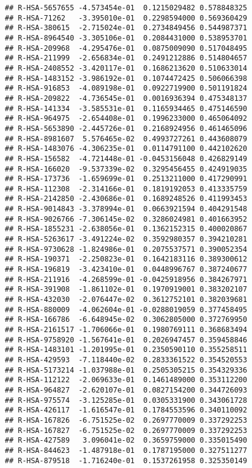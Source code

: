 \documentclass[
]{article}
\begin{document}
\begin{verbatim}
## R-HSA-5657655 -4.573454e-01  0.1215029482 0.578848325
## R-HSA-71262   -3.395010e-01  0.2298594000 0.569360429
## R-HSA-380615  -2.715024e-01  0.2734849456 0.544987371
## R-HSA-8964540 -3.305106e-01  0.2084431000 0.538953701
## R-HSA-209968  -4.295476e-01  0.0875009090 0.517048495
## R-HSA-211999  -2.656834e-01  0.2491212886 0.514804657
## R-HSA-2408552 -3.420117e-01  0.1686213620 0.510633014
## R-HSA-1483152 -3.986192e-01  0.1074472425 0.506066398
## R-HSA-916853  -4.089198e-01  0.0922719900 0.501191824
## R-HSA-209822  -4.736545e-01  0.0016936394 0.475348137
## R-HSA-141334  -3.585531e-01  0.1165934465 0.475146590
## R-HSA-964975  -2.654408e-01  0.1996233000 0.465064092
## R-HSA-5653890 -2.445726e-01  0.2168924956 0.461465096
## R-HSA-8981607  5.576465e-02  0.4993727261 0.443608079
## R-HSA-1483076 -4.306235e-01  0.0114791100 0.442102620
## R-HSA-156582  -4.721448e-01 -0.0453156048 0.426829149
## R-HSA-166020  -9.537339e-02  0.3295456455 0.424919035
## R-HSA-173736  -1.659699e-01  0.2513211000 0.417290991
## R-HSA-112308  -2.314166e-01  0.1819192053 0.413335759
## R-HSA-2142850 -2.430686e-01  0.1689248526 0.411993453
## R-HSA-9014843 -3.378994e-01  0.0663921594 0.404291548
## R-HSA-9026766 -7.306145e-02  0.3286024981 0.401663952
## R-HSA-1855231 -2.638056e-01  0.1362152315 0.400020867
## R-HSA-5263617 -3.491224e-02  0.3592980357 0.394210281
## R-HSA-9730628 -1.824986e-01  0.2075537571 0.390052354
## R-HSA-190371  -2.250823e-01  0.1642183116 0.389300612
## R-HSA-196819  -3.423410e-01  0.0448996767 0.387240677
## R-HSA-211916  -4.268599e-01 -0.0425918956 0.384267971
## R-HSA-391908  -1.861102e-01  0.1970919001 0.383202107
## R-HSA-432030  -2.076447e-02  0.3612752101 0.382039681
## R-HSA-880009  -4.062604e-01 -0.0288019059 0.377458495
## R-HSA-166786  -6.648945e-02  0.3062805000 0.372769950
## R-HSA-2161517 -1.706066e-01  0.1980769111 0.368683494
## R-HSA-9758920 -1.567641e-01  0.2026947457 0.359458846
## R-HSA-1483101 -1.201995e-01  0.2350590110 0.355258511
## R-HSA-429593  -7.118440e-02  0.2833361522 0.354520553
## R-HSA-5173214 -1.037988e-01  0.2505305215 0.354329336
## R-HSA-112122  -2.069633e-01  0.1461489000 0.353112200
## R-HSA-964827  -2.620107e-01  0.0827154200 0.344726093
## R-HSA-975574  -3.125285e-01  0.0305331900 0.343061728
## R-HSA-426117  -1.616547e-01  0.1784553596 0.340110092
## R-HSA-167826  -6.751525e-02  0.2697770009 0.337292253
## R-HSA-167827  -6.751525e-02  0.2697770009 0.337292253
## R-HSA-427589   3.096041e-02  0.3659759000 0.335015490
## R-HSA-844623  -1.487918e-01  0.1787195000 0.327511277
## R-HSA-879518  -1.716240e-01  0.1537261958 0.325350149

\end{verbatim}
\end{document}
